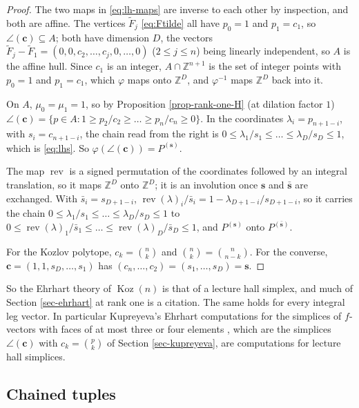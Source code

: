 \documentclass[11pt, a4paper, abstract=yes]{scrartcl}
\theoremstyle{definition}
\theoremstyle{remark}
\theoremstyle{plain}
\newcommand{\vek}[1]{\boldsymbol{#1}}
\theoremstyle{remark}
\theoremstyle{plain}
\newcommand{\Koz}{\operatorname{Koz}}
\newcommand{\rasimp}{\angle}
\begin{document}
\begin{proof}
The two maps in \eqref{eq:lh-maps} are inverse to each other by inspection, and both are affine.
The vertices \(\tilde F_j\) \eqref{eq:Ftilde} all have \(p_0=1\) and \(p_1=c_1\), so
\(\rasimp(\vek c)\subseteq A\); both have dimension \(D\), the vectors
\(\tilde F_j-\tilde F_1=(0,0,c_2,\dots,c_j,0,\dots,0)\) (\(2\le j\le n\)) being linearly independent, so
\(A\) is the affine hull. Since \(c_1\) is an integer, \(A\cap\mathbb Z^{n+1}\) is the set of integer
points with \(p_0=1\) and \(p_1=c_1\), which \(\varphi\) maps onto \(\mathbb Z^D\), and \(\varphi^{-1}\)
maps \(\mathbb Z^D\) back into it.

On \(A\), \(\mu_0=\mu_1=1\), so by Proposition \ref{prop-rank-one-H} (at dilation factor \(1\))
\(\rasimp(\vek c)=\lbrace p\in A:1\ge p_2/c_2\ge\dots\ge p_n/c_n\ge0\rbrace\). In the coordinates
\(\lambda_i=p_{n+1-i}\), with \(s_i=c_{n+1-i}\), the chain read from the right is
\(0\le\lambda_1/s_1\le\dots\le\lambda_D/s_D\le1\), which is \eqref{eq:lhs}. So
\(\varphi(\rasimp(\vek c))=P^{(\vek s)}\).

The map \(\operatorname{rev}\) is a signed permutation of the coordinates followed by an integral translation,
so it maps \(\mathbb Z^D\) onto \(\mathbb Z^D\); it is an involution once \(\vek s\) and
\(\bar{\vek s}\) are exchanged. With \(\bar s_i=s_{D+1-i}\),
\(\operatorname{rev}(\lambda)_i/\bar s_i=1-\lambda_{D+1-i}/s_{D+1-i}\), so it carries the chain
\(0\le\lambda_1/s_1\le\dots\le\lambda_D/s_D\le1\) to
\(0\le\operatorname{rev}(\lambda)_1/\bar s_1\le\dots\le\operatorname{rev}(\lambda)_D/\bar s_D\le1\), and \(P^{(\vek s)}\) onto
\(P^{(\bar{\vek s})}\).

For the Kozlov polytope, \(c_k=\binom nk\) and \(\binom nk=\binom n{n-k}\). For the converse,
\(\vek c=(1,1,s_D,\dots,s_1)\) has \((c_n,\dots,c_2)=(s_1,\dots,s_D)=\vek s\).
\end{proof}

So the Ehrhart theory of \(\Koz(n)\) is that of a lecture hall simplex, and much of
Section \ref{sec-ehrhart} at rank one is a citation. The same holds for every integral leg vector. In
particular Kupreyeva's Ehrhart computations for the simplices of \(f\)-vectors with faces of at most
three or four elements \autocite{Kupreyeva2019}, which are the simplices \(\rasimp(\vek c)\) with
\(c_k=\binom pk\) of Section \ref{sec-kupreyeva}, are computations for lecture hall simplices.
\subsection{Chained tuples}
\label{sec:org12704f5}
\end{document}
